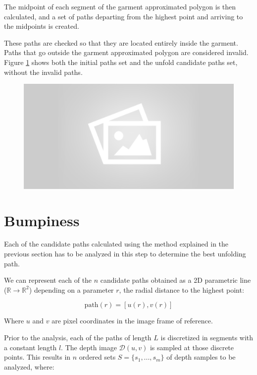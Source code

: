 The midpoint of each segment of the garment approximated polygon is then calculated, and a set of paths departing from the highest point and arriving to the midpoints is created.

These paths are checked so that they are located entirely inside the garment. Paths that go outside the garment approximated polygon are considered invalid. Figure \ref{fig:candidate_paths} shows both the initial paths set and the unfold candidate paths set, without the invalid paths.

\begin{figure}[thpb]
    \centering
    \includegraphics[width=0.7
    \textwidth]{figures/placeholder2.png}
    \caption{}
    \label{fig:candidate_paths}
\end{figure}

\section{Bumpiness}
\label{bumpiness}
Each of the candidate paths calculated using the method explained in the previous section has to be analyzed in this step to determine the best unfolding path. 

We can represent each of the $n$ candidate paths obtained as a 2D parametric line ($\mathbb{R} \to \mathbb{R}^2$) depending on a parameter $r$, the radial distance to the highest point:

\begin{equation}
\textrm{path}(r) = \left[u(r), v(r)\right]
\end{equation}

Where $u$ and $v$ are pixel coordinates in the image frame of reference.

Prior to the analysis, each of the paths of length $L$ is discretized in segments with a constant length $l$. The depth image $\mathcal{D}(u,v)$ is sampled at those discrete points. This results in $n$ ordered sets $S=\{ s_1,...,s_m\}$ of depth samples to be analyzed, where:


